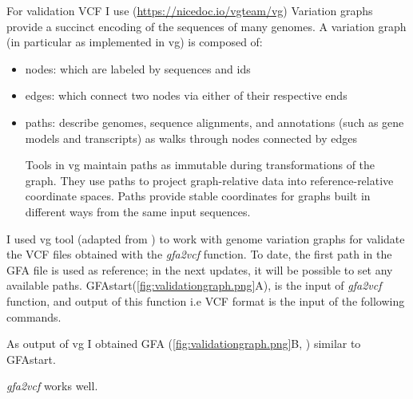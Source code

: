 For validation VCF I use (\url{https://nicedoc.io/vgteam/vg}) Variation graphs provide a succinct encoding of the sequences of many genomes. 
A variation graph (in particular as implemented in vg) is composed of:
\begin{itemize}
\item nodes: which are labeled by sequences and ids
    
\item edges: which connect two nodes via either of their respective ends
   
\item paths: describe genomes, sequence alignments, and annotations (such as gene models and transcripts) as walks through nodes connected by edges

Tools in vg maintain paths as immutable during transformations of the graph. They use paths to project graph-relative data into reference-relative coordinate spaces. Paths provide stable coordinates for graphs built in different ways from the same input sequences.

\end{itemize}
I used vg tool (adapted from \cite{vg}) to work with genome variation graphs for validate the VCF files obtained with the \textit{gfa2vcf} function. To date, the first path in the GFA file is used as reference; in the next updates, it will be possible to set any available paths.
GFAstart(\ref{fig:validationgraph.png}A), is the input of \textit{gfa2vcf} function, and output of this function i.e VCF format is the input of the following commands.  

As output of vg I obtained GFA (\ref{fig:validationgraph.png}B, ) similar to GFAstart. 

\textit{gfa2vcf} works well. 



